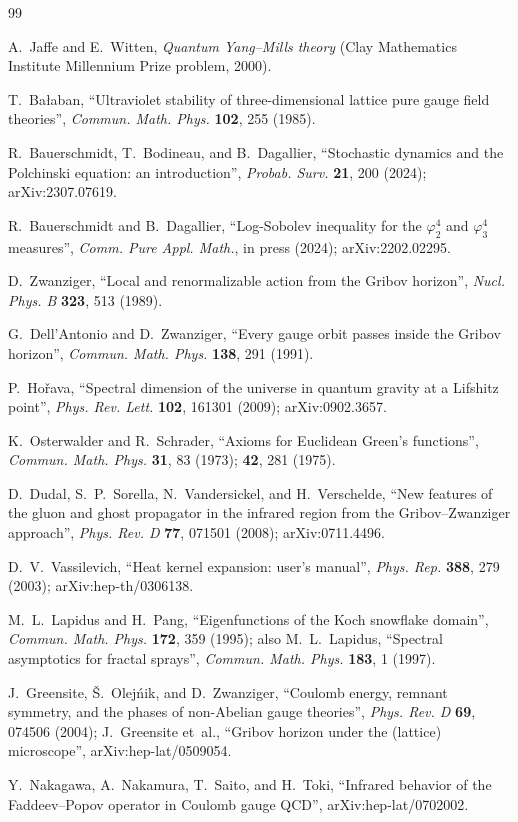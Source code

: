 \documentclass[aps,prl,reprint,nofootinbib,superscriptaddress,floatfix]{revtex4-2}
\begin{document}
\begin{thebibliography}{99}

 A.~Jaffe and E.~Witten, \emph{Quantum Yang--Mills theory} (Clay Mathematics Institute Millennium Prize problem, 2000).

 T.~Ba\l{}aban, ``Ultraviolet stability of three-dimensional lattice pure gauge field theories'', \emph{Commun. Math. Phys.} \textbf{102}, 255 (1985).

 R.~Bauerschmidt, T.~Bodineau, and B.~Dagallier, ``Stochastic dynamics and the Polchinski equation: an introduction'', \emph{Probab. Surv.} \textbf{21}, 200 (2024); arXiv:2307.07619.

 R.~Bauerschmidt and B.~Dagallier, ``Log-Sobolev inequality for the $\varphi^4_2$ and $\varphi^4_3$ measures'', \emph{Comm. Pure Appl. Math.}, in press (2024); arXiv:2202.02295.

 D.~Zwanziger, ``Local and renormalizable action from the Gribov horizon'', \emph{Nucl. Phys. B} \textbf{323}, 513 (1989).

 G.~Dell'Antonio and D.~Zwanziger, ``Every gauge orbit passes inside the Gribov horizon'', \emph{Commun. Math. Phys.} \textbf{138}, 291 (1991).

 P.~Ho\v rava, ``Spectral dimension of the universe in quantum gravity at a Lifshitz point'', \emph{Phys. Rev. Lett.} \textbf{102}, 161301 (2009); arXiv:0902.3657.

 K.~Osterwalder and R.~Schrader, ``Axioms for Euclidean Green's functions'', \emph{Commun. Math. Phys.} \textbf{31}, 83 (1973); \textbf{42}, 281 (1975).

 D.~Dudal, S.~P.~Sorella, N.~Vandersickel, and H.~Verschelde, ``New features of the gluon and ghost propagator in the infrared region from the Gribov--Zwanziger approach'', \emph{Phys. Rev. D} \textbf{77}, 071501 (2008); arXiv:0711.4496.

 D.~V.~Vassilevich, ``Heat kernel expansion: user's manual'', \emph{Phys. Rep.} \textbf{388}, 279 (2003); arXiv:hep-th/0306138.

 M.~L.~Lapidus and H.~Pang, ``Eigenfunctions of the Koch snowflake domain'', \emph{Commun. Math. Phys.} \textbf{172}, 359 (1995); also M.~L.~Lapidus, ``Spectral asymptotics for fractal sprays'', \emph{Commun. Math. Phys.} \textbf{183}, 1 (1997).

 J.~Greensite, \v S.~Olej\'nik, and D.~Zwanziger, ``Coulomb energy, remnant symmetry, and the phases of non-Abelian gauge theories'', \emph{Phys. Rev. D} \textbf{69}, 074506 (2004); J.~Greensite et~al., ``Gribov horizon under the (lattice) microscope'', arXiv:hep-lat/0509054.

 Y.~Nakagawa, A.~Nakamura, T.~Saito, and H.~Toki, ``Infrared behavior of the Faddeev--Popov operator in Coulomb gauge QCD'', arXiv:hep-lat/0702002.

\end{thebibliography}
\end{document}
